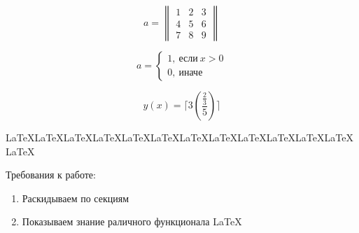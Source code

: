 \documentclass{book}
\begin{document}
    \begin{equation}
        a =
            \begin{Vmatrix}
                1 & 2 & 3 \\
                4 & 5 & 6 \\
                7 & 8 & 9
            \end{Vmatrix}
    \end{equation}

    \begin{equation}
        a =
            \begin{cases}
                1, ~ \text{если} ~ x > 0 \\
                0, ~ \text{иначе}
            \end{cases}
    \end{equation}

    \begin{equation}
        y(x) = \lceil 3 \left(\frac{\frac{2}{3}}{5}\right) \rceil
    \end{equation}


    \LaTeX\LaTeX\LaTeX\LaTeX\LaTeX\LaTeX\LaTeX\LaTeX\LaTeX\LaTeX\LaTeX\LaTeX\LaTeX

    Требования к работе:
    \begin{enumerate}
        \item Раскидываем по секциям
        \item Показываем знание раличного функционала \LaTeX
    \end{enumerate}
\end{document}

